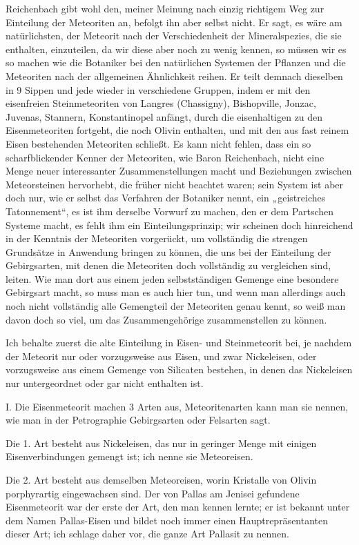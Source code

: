 \documentclass[a4paper, 11pt, oneside]{article}
\begin{document}
Reichenbach gibt wohl den, meiner Meinung nach einzig richtigem Weg zur Einteilung der Meteoriten an, befolgt ihn aber selbst nicht. Er sagt, es wäre am natürlichsten, der Meteorit nach der Verschiedenheit der Mineralspezies, die sie enthalten, einzuteilen, da wir diese aber noch zu wenig kennen, so müssen wir es so machen wie die Botaniker bei den natürlichen Systemen der Pflanzen und die Meteoriten nach der allgemeinen Ähnlichkeit reihen. Er teilt demnach dieselben in 9 Sippen und jede wieder in verschiedene Gruppen, indem er mit den eisenfreien Steinmeteoriten von Langres (Chassigny), Bishopville, Jonzac, Juvenas, Stannern, Konstantinopel anfängt, durch die eisenhaltigen zu den Eisenmeteoriten fortgeht, die noch Olivin enthalten, und mit den aus fast reinem Eisen bestehenden Meteoriten schließt. Es kann nicht fehlen, dass ein so scharfblickender Kenner der Meteoriten, wie Baron Reichenbach, nicht eine Menge neuer interessanter Zusammenstellungen macht und Beziehungen zwischen Meteorsteinen hervorhebt, die früher nicht beachtet waren; sein System ist aber doch nur, wie er selbst das Verfahren der Botaniker nennt, ein „geistreiches Tatonnement“, es ist ihm derselbe Vorwurf zu machen, den er dem Partschen Systeme macht, es fehlt ihm ein Einteilungsprinzip; wir scheinen doch hinreichend in der Kenntnis der Meteoriten vorgerückt, um vollständig die strengen Grundsätze in Anwendung bringen zu können, die uns bei der Einteilung der Gebirgsarten, mit denen die Meteoriten doch vollständig zu vergleichen sind, leiten. Wie man dort aus einem jeden selbstständigen Gemenge eine besondere Gebirgsart macht, so muss man es auch hier tun, und wenn man allerdings auch noch nicht vollständig alle Gemengteil der Meteoriten genau kennt, so weiß man davon doch so viel, um das Zusammengehörige zusammenstellen zu können.

Ich behalte zuerst die alte Einteilung in Eisen- und Steinmeteorit bei, je nachdem der Meteorit nur oder vorzugsweise aus Eisen, und zwar Nickeleisen, oder vorzugsweise aus einem Gemenge von Silicaten bestehen, in denen das Nickeleisen nur untergeordnet oder gar nicht enthalten ist.

I. Die Eisenmeteorit machen 3 Arten aus, Meteoritenarten kann man sie nennen, wie man in der Petrographie Gebirgsarten oder Felsarten sagt.

Die 1. Art besteht aus Nickeleisen, das nur in geringer Menge mit einigen Eisenverbindungen gemengt ist; ich nenne sie Meteoreisen.

Die 2. Art besteht aus demselben Meteoreisen, worin Kristalle von Olivin porphyrartig eingewachsen sind. Der von Pallas am Jenisei gefundene Eisenmeteorit war der erste der Art, den man kennen lernte; er ist bekannt unter dem Namen Pallas-Eisen und bildet noch immer einen Hauptrepräsentanten dieser Art; ich schlage daher vor, die ganze Art Pallasit zu nennen.
\end{document}
